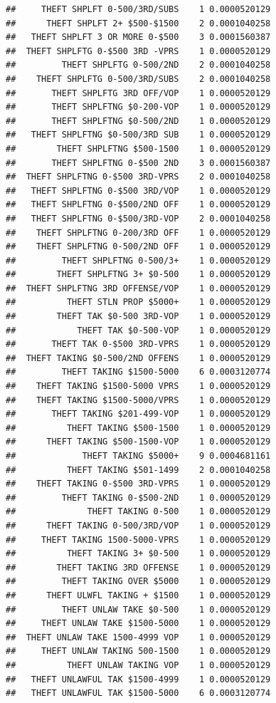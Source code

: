 \documentclass[]{book}
\begin{document}
\begin{verbatim}
##     THEFT SHPLFT 0-500/3RD/SUBS    1 0.0000520129
##      THEFT SHPLFT 2+ $500-$1500    2 0.0001040258
##   THEFT SHPLFT 3 OR MORE 0-$500    3 0.0001560387
##  THEFT SHPLFTG 0-$500 3RD -VPRS    1 0.0000520129
##         THEFT SHPLFTG 0-500/2ND    2 0.0001040258
##    THEFT SHPLFTG 0-500/3RD/SUBS    2 0.0001040258
##       THEFT SHPLFTG 3RD OFF/VOP    1 0.0000520129
##       THEFT SHPLFTNG $0-200-VOP    1 0.0000520129
##       THEFT SHPLFTNG $0-500/2ND    1 0.0000520129
##   THEFT SHPLFTNG $0-500/3RD SUB    1 0.0000520129
##        THEFT SHPLFTNG $500-1500    1 0.0000520129
##       THEFT SHPLFTNG 0-$500 2ND    3 0.0001560387
##  THEFT SHPLFTNG 0-$500 3RD-VPRS    2 0.0001040258
##   THEFT SHPLFTNG 0-$500 3RD/VOP    1 0.0000520129
##   THEFT SHPLFTNG 0-$500/2ND OFF    1 0.0000520129
##   THEFT SHPLFTNG 0-$500/3RD-VOP    2 0.0001040258
##    THEFT SHPLFTNG 0-200/3RD OFF    1 0.0000520129
##    THEFT SHPLFTNG 0-500/2ND OFF    1 0.0000520129
##         THEFT SHPLFTNG 0-500/3+    1 0.0000520129
##        THEFT SHPLFTNG 3+ $0-500    1 0.0000520129
##  THEFT SHPLFTNG 3RD OFFENSE/VOP    1 0.0000520129
##          THEFT STLN PROP $5000+    1 0.0000520129
##        THEFT TAK $0-500 3RD-VOP    1 0.0000520129
##            THEFT TAK $0-500-VOP    1 0.0000520129
##       THEFT TAK 0-$500 3RD-VPRS    1 0.0000520129
##  THEFT TAKING $0-500/2ND OFFENS    1 0.0000520129
##         THEFT TAKING $1500-5000    6 0.0003120774
##    THEFT TAKING $1500-5000 VPRS    1 0.0000520129
##    THEFT TAKING $1500-5000/VPRS    1 0.0000520129
##       THEFT TAKING $201-499-VOP    1 0.0000520129
##          THEFT TAKING $500-1500    1 0.0000520129
##      THEFT TAKING $500-1500-VOP    1 0.0000520129
##             THEFT TAKING $5000+    9 0.0004681161
##          THEFT TAKING $501-1499    2 0.0001040258
##    THEFT TAKING 0-$500 3RD-VPRS    1 0.0000520129
##         THEFT TAKING 0-$500-2ND    1 0.0000520129
##              THEFT TAKING 0-500    1 0.0000520129
##      THEFT TAKING 0-500/3RD/VOP    1 0.0000520129
##     THEFT TAKING 1500-5000-VPRS    1 0.0000520129
##          THEFT TAKING 3+ $0-500    1 0.0000520129
##        THEFT TAKING 3RD OFFENSE    1 0.0000520129
##         THEFT TAKING OVER $5000    1 0.0000520129
##      THEFT ULWFL TAKING + $1500    1 0.0000520129
##         THEFT UNLAW TAKE $0-500    1 0.0000520129
##     THEFT UNLAW TAKE $1500-5000    1 0.0000520129
##  THEFT UNLAW TAKE 1500-4999 VOP    1 0.0000520129
##     THEFT UNLAW TAKING 500-1500    1 0.0000520129
##          THEFT UNLAW TAKING VOP    1 0.0000520129
##   THEFT UNLAWFUL TAK $1500-4999    1 0.0000520129
##   THEFT UNLAWFUL TAK $1500-5000    6 0.0003120774

\end{verbatim}
\end{document}
